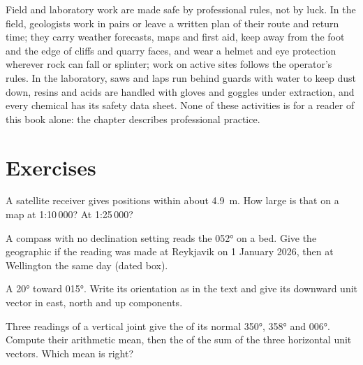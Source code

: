 \begin{safety}
Field and laboratory work are made safe by professional rules, not by luck.
In the field, geologists work in pairs or leave a written plan of their route
and return time; they carry weather forecasts, maps and first aid, keep away
from the foot and the edge of cliffs and quarry faces, and wear a helmet and
eye protection wherever rock can fall or splinter; work on active sites
follows the operator's rules. In the laboratory, saws and laps run behind
guards with water to keep dust down, resins and acids are handled with gloves
and goggles under extraction, and every chemical has its safety data sheet.
None of these activities is for a reader of this book alone: the chapter
describes professional practice.
\end{safety}

\section{Exercises}

\begin{exercise}[$\star$]\label{exo:b1:field-lab-methods-1:1}
A satellite receiver gives positions within about \qty{4.9}{m}. How large is
that on a map at 1:10\,000? At 1:25\,000?
\end{exercise}

\begin{exercise}[$\star$]\label{exo:b1:field-lab-methods-1:2}
A compass with no declination setting reads the  \ang{052} on a
bed. Give the geographic  if the reading was made at Reykjavik
on 1 January 2026, then at Wellington the same day (dated box).
\end{exercise}

\begin{exercise}[$\star$]\label{exo:b1:field-lab-methods-1:3}
A   \ang{20} toward \ang{015}. Write its orientation as in the
text and give its downward unit vector in east, north and up components.
\end{exercise}

\begin{exercise}[$\star$]\label{exo:b1:field-lab-methods-1:4}
Three readings of a vertical joint give the  of its normal \ang{350},
\ang{358} and \ang{006}. Compute their arithmetic mean, then the  of
the sum of the three horizontal unit vectors. Which mean is right?
\end{exercise}

